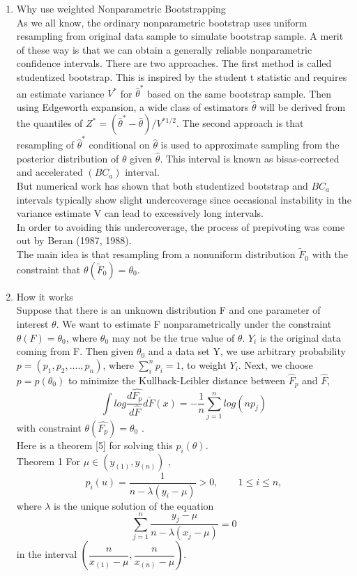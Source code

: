 \documentclass[a4paper,11pt]{article}
\begin{document}
\begin{enumerate}
  
\item Why use weighted Nonparametric Bootstrapping\\
As we all know, the ordinary nonparametric bootstrap uses uniform resampling from original data sample to simulate bootstrap sample. A merit of these way is that we can obtain a generally reliable nonparametric confidence intervals. There are two approaches. The first method is called studentized bootstrap. This is inspired by the student t statistic and requires an estimate variance $ V^* $ for $ \hat{\theta}^* $ based on the same bootstrap sample. Then using Edgeworth expansion, a wide class of estimators $ \hat{\theta} $ will be derived from the quantiles of $ Z^* = (\hat{\theta}^* -\hat{\theta} )/V^{*1/2} $. The second approach is that resampling of $ \hat{\theta}^* $ conditional on $ \hat{\theta} $ is used to approximate sampling from the posterior distribution of $\theta $ given $\hat{\theta} $. This interval is known as bisas-corrected and accelerated $(BC_a)$ interval.\\
But numerical work has shown that both studentized bootstrap and $ BC_a $ intervals typically show slight undercoverage since occasional instability in the variance estimate V can lead to excessively long intervals. \\
In order to avoiding this undercoverage, the process of prepivoting was come out by Beran (1987, 1988). \\
The main idea is that resampling from a nonuniform distribution $ \widetilde{F}_0 $ with the constraint that $ \theta(\widetilde{F}_0 ) = \theta_0 $.  \\
\item How it works \\
Suppose that there is an unknown distribution F and one parameter of interest $ \theta $. We want to estimate F nonparametrically under the constraint $ \theta(F) =\theta_0 $, where $ \theta_0 $ may not be the true value of $ \theta $. $ Y_i $ is the original data coming from F. Then given $ \theta_0 $ and a data set Y, we use arbitrary probability $ p= ( p_1, p_2, ...., p_n ) $, where $ \sum_i ^n p_i=1 $, to weight $ Y_i $. Next, we choose $ p=p(\theta_0) $ to minimize the Kullback-Leibler distance between $ \hat{F}_p $ and $ \hat{F} $,
$$ \int log\dfrac{d \hat{F_p} }{d \hat{F}} d \widetilde{F}(x) = -\dfrac{1}{n} \sum_{j=1}^n log(n p_j) $$ with constraint $ \theta(\hat{F_p})= \theta_0 $ . \\
Here is a theorem [5] for solving this $ p_i(\theta) $. \\
Theorem 1 For $ \mu \in ( y_{(1)}, y_{(n)}) $ ,
$$ p_i(u)=\dfrac{1}{n- \lambda (y_i - \mu )} >0 , \qquad 1\le i \le n , $$
where $ \lambda $ is the unique solution of the equation $$ \sum_{j=1}^n \dfrac{y_j - \mu}{n- \lambda (x_j - \mu)}=0 $$ in the interval $(\dfrac{n}{x_{(1)}-\mu}, \dfrac{n}{x_{(n)}-\mu} )$.


\end{enumerate}
\end{document}
